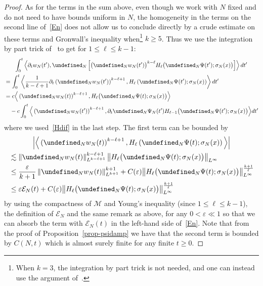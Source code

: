 \documentclass[10pt]{amsart}
\theoremstyle{definition}\newtheorem{defi}[theo]{Definition}\newtheorem{rema}[theo]{Remark}\newtheorem{exam}[theo]{Example}\newtheorem{exem}[theo]{Example}\newtheorem{nota}[theo]{Notation}
\let\P= \undefined
\newcommand{\P}{\mathbf{P}}
\newcommand{\En}{\mathcal{E}}
\newcommand{\M}{\mathcal{M}}
\newcommand{\eps}{\varepsilon}
\newcommand{\s}{\sigma}
\newcommand{\dt}{\partial_t}
\newcommand{\les}{\lesssim}
\begin{document}
\begin{proof}
As for the terms in the sum above, even though we work with $N$ fixed and do not need to have bounds uniform in $N$, the homogeneity in the terms on the second line of~\eqref{En} does not allow us to conclude directly by a crude estimate on these terms and Gronwall's inequality when\footnote{When $k=3$, the integration by part trick is not needed, and one can instead use the argument of~\cite{BT3}.} $k\ge 5$. Thus we use the integration by part trick of~\cite{OP} to get for $1\le \ell \le k-1$:
\begin{multline*}
\int_0^t\left\langle \dt w_N(t'),\P_N\left[\big(\P_Nw_N(t')\big)^{k-\ell}H_{\ell}\big(\P_N\Psi(t');\s_N(x)\big)\right]\right\rangle dt'\\
\begin{aligned}
& = \int_0^t\left\langle \frac1{k-\ell+1}\dt \left(\P_Nw_N(t')\right)^{k-\ell+1},H_{\ell}\left(\P_N\Psi(t');\s_N(x)\right)\right\rangle dt'\\
& = c\Big\langle \left(\P_Nw_N(t)\right)^{k-\ell+1},H_{\ell}\big(\P_N\Psi(t);\s_N(x)\big)\Big\rangle\\
&\quad- c\int_0^t\Big\langle \left(\P_Nw_N(t')\right)^{k-\ell+1},\dt\P_N\Psi_N(t') H_{\ell-1}\big(\P_N\Psi(t');\s_N(x)\big)\Big\rangle dt'
\end{aligned}
\end{multline*}
where we used~\eqref{Hdif} in the last step. The first term can be bounded by
\begin{multline*}
\Big|\Big\langle \left(\P_Nw_N(t)\right)^{k-\ell+1},H_{\ell}\left(\P_N\Psi(t);\s_N(x)\right)\Big\rangle\Big|\\
\begin{aligned}
&\les \left\|\P_Nw_N(t)\right\|_{L^{k-\ell+1}}^{k-\ell+1}\big\|H_{\ell}\big(\P_N\Psi(t);\s_N(x)\big)\big\|_{L^\infty}\\
&\le \frac{\eps}{k+1} \left\|\P_Nw_N(t)\right\|_{L^{k+1}}^{k+1} + C(\eps)\big\|H_{\ell}\big(\P_N\Psi(t);\s_N(x)\big)\big\|_{L^\infty}^{\frac{k+1}{\ell}}\\
& \le \eps\En_N(t) + C(\eps)\big\|H_{\ell}\big(\P_N\Psi(t);\s_N(x)\big)\big\|_{L^\infty}^{\frac{k+1}{\ell}}
\end{aligned}
\end{multline*}
by using the compactness of $\M$ and Young's inequality (since $1\le \ell \le k-1$), the definition of $\En_N$ and the same remark as above, for any $0<\eps\ll 1$ so that we can absorb the term with $\En_N(t)$ in the left-hand side of~\eqref{En}. Note that from the proof of Proposition~\ref{prop-psidamp} we have that the second term is bounded by $C(N,t)$ which is almost surely finite for any finite $t\ge 0$.


\end{proof}
\end{document}
